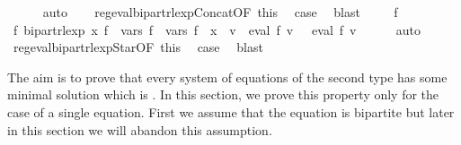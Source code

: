 \begin{isabellebody}
\ \ \ \ \isamarkupfalse%
\ auto\isanewline
\ \ \isamarkupfalse%
\ reg{\isacharunderscore}{\kern0pt}eval{\isacharunderscore}{\kern0pt}bipart{\isacharunderscore}{\kern0pt}rlexp{\isacharunderscore}{\kern0pt}Concat{\isacharbrackleft}{\kern0pt}OF\ this{\isacharbrackright}{\kern0pt}\ \isamarkupfalse%
\ {\isacharquery}{\kern0pt}case\ \isamarkupfalse%
\ blast\isanewline
{}\isamarkupfalse%
\isanewline
\ \ \isamarkupfalse%
\ {\isacharparenleft}{\kern0pt}{}\ f{\isacharparenright}{\kern0pt}\isanewline
\ \ \isamarkupfalse%
\ \isamarkupfalse%
\ {\isachardoublequoteopen}{\isasymexists}f{\isacharprime}{\kern0pt}{\isachardot}{\kern0pt}\ bipart{\isacharunderscore}{\kern0pt}rlexp\ x\ f{\isacharprime}{\kern0pt}\ {\isasymand}\ vars\ f{\isacharprime}{\kern0pt}\ {\isacharequal}{\kern0pt}\ vars\ f\ {\isasymunion}\ {\isacharbraceleft}{\kern0pt}x{\isacharbraceright}{\kern0pt}\ {\isasymand}\ {\isacharparenleft}{\kern0pt}{\isasymforall}v{\isachardot}{\kern0pt}\ {\isasymPsi}\ {\isacharparenleft}{\kern0pt}eval\ f\ v{\isacharparenright}{\kern0pt}\ {\isacharequal}{\kern0pt}\ {\isasymPsi}\ {\isacharparenleft}{\kern0pt}eval\ f{\isacharprime}{\kern0pt}\ v{\isacharparenright}{\kern0pt}{\isacharparenright}{\kern0pt}{\isachardoublequoteclose}\isanewline
\ \ \ \ \isamarkupfalse%
\ auto\isanewline
\ \ \isamarkupfalse%
\ reg{\isacharunderscore}{\kern0pt}eval{\isacharunderscore}{\kern0pt}bipart{\isacharunderscore}{\kern0pt}rlexp{\isacharunderscore}{\kern0pt}Star{\isacharbrackleft}{\kern0pt}OF\ this{\isacharbrackright}{\kern0pt}\ \isamarkupfalse%
\ {\isacharquery}{\kern0pt}case\ \isamarkupfalse%
\ blast\isanewline
{}\isamarkupfalse%
%
\endisatagproof
{\isafoldproof}%
%
\isadelimproof
%
\endisadelimproof
%
\isadelimdocument
%
\endisadelimdocument
%
\isatagdocument
%
\isamarkuptrue%
%
\endisatagdocument
{\isafolddocument}%
%
\isadelimdocument
%
\endisadelimdocument
%
\begin{isamarkuptext}%
The aim is to prove that every system of equations of the second type
has some minimal solution which is . In this section, we prove this property
only for the case of a single equation. First we assume that the equation is bipartite but later
in this section we will abandon this assumption.%
\end{isamarkuptext}\isamarkuptrue%

\end{isabellebody}
